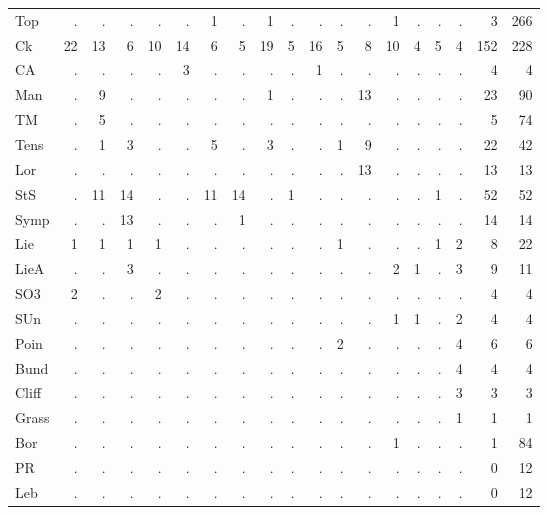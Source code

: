 {\begin{longtable}{l r r r r r r r r r r r r r r r r r r}
\textsf{Top} & . & . & . & . & . & 1 & . & 1 & . & . & . & . & 1 & . & . & . & 3 & 266 \\
\textsf{Ck} & 22 & 13 & 6 & 10 & 14 & 6 & 5 & 19 & 5 & 16 & 5 & 8 & 10 & 4 & 5 & 4 & 152 & 228 \\
\textsf{CA} & . & . & . & . & 3 & . & . & . & . & 1 & . & . & . & . & . & . & 4 & 4 \\
\textsf{Man} & . & 9 & . & . & . & . & . & 1 & . & . & . & 13 & . & . & . & . & 23 & 90 \\
\textsf{TM} & . & 5 & . & . & . & . & . & . & . & . & . & . & . & . & . & . & 5 & 74 \\
\textsf{Tens} & . & 1 & 3 & . & . & 5 & . & 3 & . & . & 1 & 9 & . & . & . & . & 22 & 42 \\
\textsf{Lor} & . & . & . & . & . & . & . & . & . & . & . & 13 & . & . & . & . & 13 & 13 \\
\textsf{StS} & . & 11 & 14 & . & . & 11 & 14 & . & 1 & . & . & . & . & . & 1 & . & 52 & 52 \\
\textsf{Symp} & . & . & 13 & . & . & . & 1 & . & . & . & . & . & . & . & . & . & 14 & 14 \\
\textsf{Lie} & 1 & 1 & 1 & 1 & . & . & . & . & . & . & 1 & . & . & . & 1 & 2 & 8 & 22 \\
\textsf{LieA} & . & . & 3 & . & . & . & . & . & . & . & . & . & 2 & 1 & . & 3 & 9 & 11 \\
\textsf{SO3} & 2 & . & . & 2 & . & . & . & . & . & . & . & . & . & . & . & . & 4 & 4 \\
\textsf{SUn} & . & . & . & . & . & . & . & . & . & . & . & . & 1 & 1 & . & 2 & 4 & 4 \\
\textsf{Poin} & . & . & . & . & . & . & . & . & . & . & 2 & . & . & . & . & 4 & 6 & 6 \\
\textsf{Bund} & . & . & . & . & . & . & . & . & . & . & . & . & . & . & . & 4 & 4 & 4 \\
\textsf{Cliff} & . & . & . & . & . & . & . & . & . & . & . & . & . & . & . & 3 & 3 & 3 \\
\textsf{Grass} & . & . & . & . & . & . & . & . & . & . & . & . & . & . & . & 1 & 1 & 1 \\
\textsf{Bor} & . & . & . & . & . & . & . & . & . & . & . & . & 1 & . & . & . & 1 & 84 \\
\textsf{PR} & . & . & . & . & . & . & . & . & . & . & . & . & . & . & . & . & 0 & 12 \\
\textsf{Leb} & . & . & . & . & . & . & . & . & . & . & . & . & . & . & . & . & 0 & 12 \\

\end{longtable}}
